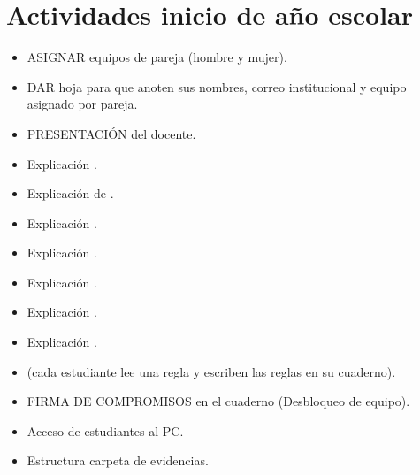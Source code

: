 \documentclass[letterpaper,10pt,spanish]{sphinxmanual}
\begin{document}
\section{Actividades inicio de año escolar}
\label{\detokenize{0_intro/informacion:actividades-inicio-de-ano-escolar}}\begin{itemize}
\item {} 
\sphinxAtStartPar
 ASIGNAR equipos de pareja (hombre y mujer).

\item {} 
\sphinxAtStartPar
 DAR hoja para que anoten sus nombres, correo institucional y equipo asignado por pareja.

\item {} 
\sphinxAtStartPar
 PRESENTACIÓN del docente.

\item {} 
\sphinxAtStartPar
 Explicación .

\item {} 
\sphinxAtStartPar
 Explicación de .

\item {} 
\sphinxAtStartPar
 Explicación .

\item {} 
\sphinxAtStartPar
 Explicación .

\item {} 
\sphinxAtStartPar
 Explicación .

\item {} 
\sphinxAtStartPar
 Explicación .

\item {} 
\sphinxAtStartPar
 Explicación .

\item {} 
\sphinxAtStartPar
  (cada estudiante lee una regla y escriben las reglas en su cuaderno).

\item {} 
\sphinxAtStartPar
 FIRMA DE COMPROMISOS en el cuaderno (Desbloqueo de equipo).

\item {} 
\sphinxAtStartPar
 Acceso de estudiantes al PC.

\item {} 
\sphinxAtStartPar
 Estructura carpeta de evidencias.

\end{itemize}
\end{document}
